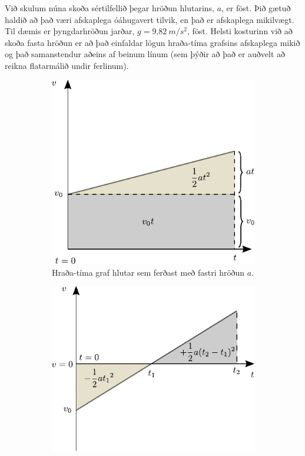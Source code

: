 Við skulum núna skoða sértilfellið þegar hröðun hlutarins, $a$, er föst. Þið gætuð haldið að það væri afskaplega óáhugavert tilvik, en það er afskaplega mikilvægt. Til dæmis er þyngdarhröðun jarðar, $g = \SI{9.82}{m/s^2}$, föst. Helsti kosturinn við að skoða fasta hröðun er að það einfaldar lögun hraða-tíma grafsins afskaplega mikið og það samanstendur aðeins af beinum línum (sem þýðir að það er auðvelt að reikna flatarmálið undir ferlinum).

\begin{figure}[H]
    \centering
\begin{subfigure}[h]{.4\textwidth}
    \centering
    \includegraphics[width=\linewidth]{figures/hradatimagraf-sonnun.pdf}
    \caption{Hraða-tíma graf hlutar sem ferðast með fastri hröðun $a$.}
    \label{fig:fast-hrodun}
\end{subfigure}
\hfill
\begin{subfigure}[h]{.4\textwidth}
    \centering
    \includegraphics[width=\linewidth]{figures/hradatimagraf-neikvaett.pdf}

\end{subfigure}
\end{figure}
